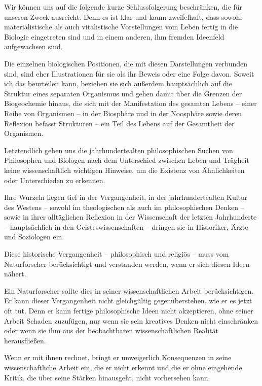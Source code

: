 \documentclass[11pt,a4paper]{book}
\begin{document}
Wir können uns auf die folgende kurze Schlussfolgerung beschränken, die für unseren Zweck ausreicht. Denn es ist klar und kaum zweifelhaft, dass sowohl materialistische als auch vitalistische Vorstellungen vom Leben fertig in die Biologie eingetreten sind und in einem anderen, ihm fremden Ideenfeld aufgewachsen sind.



Die einzelnen biologischen Positionen, die mit diesen Darstellungen verbunden sind, sind eher Illustrationen für sie als ihr Beweis oder eine Folge davon. Soweit ich das beurteilen kann, beziehen sie sich außerdem hauptsächlich auf die Struktur eines separaten Organismus und gehen damit über die Grenzen der Biogeochemie hinaus, die sich mit der Manifestation des gesamten Lebens -- einer Reihe von Organismen -- in der Biosphäre und in der Noosphäre sowie deren Reflexion befasst Strukturen -- ein Teil des Lebens auf der Gesamtheit der Organismen.



Letztendlich geben uns die jahrhundertealten philosophischen Suchen von Philosophen und Biologen nach dem Unterschied zwischen Leben und Trägheit keine wissenschaftlich wichtigen Hinweise, um die Existenz von Ähnlichkeiten oder Unterschieden zu erkennen.



Ihre Wurzeln liegen tief in der Vergangenheit, in der jahrhundertealten Kultur des Westens -- sowohl im theologischen als auch im philosophischen Denken -- sowie in ihrer alltäglichen Reflexion in der Wissenschaft der letzten Jahrhunderte -- hauptsächlich in den Geisteswissenschaften -- dringen sie in Historiker, Ärzte und Soziologen ein.



Diese historische Vergangenheit -- philosophisch und religiös -- muss vom Naturforscher berücksichtigt und verstanden werden, wenn er sich diesen Ideen nähert.



Ein Naturforscher sollte dies in seiner wissenschaftlichen Arbeit berücksichtigen. Er kann dieser Vergangenheit nicht gleichgültig gegenüberstehen, wie er es jetzt oft tut. Denn er kann fertige philosophische Ideen nicht akzeptieren, ohne seiner Arbeit Schaden zuzufügen, nur wenn sie sein kreatives Denken nicht einschränken oder wenn sie ihm aus der beobachtbaren wissenschaftlichen Realität herausfließen.



Wenn er mit ihnen rechnet, bringt er unweigerlich Konsequenzen in seine wissenschaftliche Arbeit ein, die er nicht erkennt und die er ohne eingehende Kritik, die über seine Stärken hinausgeht, nicht vorhersehen kann.
\end{document}
